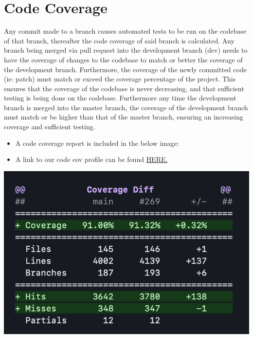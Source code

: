 \documentclass[12pt]{article}
\begin{document}
\section{Code Coverage}
Any commit made to a branch causes automated tests to be run on the codebase of that branch, thereafter the code coverage of said branch is calculated.
Any branch being merged via pull request into the development branch (dev) needs to have the coverage of changes to the codebase to match or better the coverage of the development branch.
Furthermore, the coverage of the newly committed code (ie: patch) must match or exceed the coverage percentage of the project.
This ensures that the coverage of the codebase is never decreasing, and that sufficient testing is being done on the codebase.
Furthermore any time the development branch is merged into the master branch, the coverage of the development branch must match or be higher than that of the master branch, ensuring an increasing coverage and sufficient testing.
\begin{itemize}
    \item A code coverage report is included in the below image:
    \item A link to our code cov profile can be found \href{https://codecov.io/gh/COS301-SE-2023/Domain-Pulse-A-Sentiment-Analysis-Platform}{HERE.}
\end{itemize}
\includegraphics[width=\textwidth]{codecovReport.png}

\newpage
\end{document}
